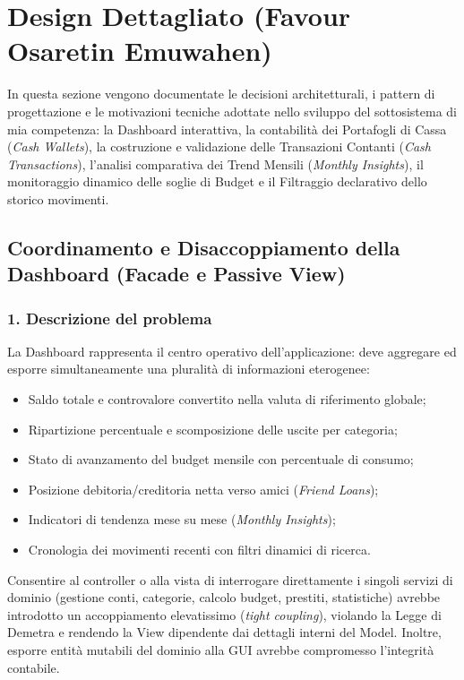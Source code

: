 \documentclass[11pt,a4paper,openright]{report}
\begin{document}
\section{Design Dettagliato (Favour Osaretin Emuwahen)}

In questa sezione vengono documentate le decisioni architetturali, i pattern di progettazione e le motivazioni tecniche adottate nello sviluppo del sottosistema di mia competenza: la Dashboard interattiva, la contabilità dei Portafogli di Cassa (\emph{Cash Wallets}), la costruzione e validazione delle Transazioni Contanti (\emph{Cash Transactions}), l'analisi comparativa dei Trend Mensili (\emph{Monthly Insights}), il monitoraggio dinamico delle soglie di Budget e il Filtraggio declarativo dello storico movimenti.

\subsection{Coordinamento e Disaccoppiamento della Dashboard (Facade e Passive View)}
\subsubsection*{1. Descrizione del problema}
La Dashboard rappresenta il centro operativo dell'applicazione: deve aggregare ed esporre simultaneamente una pluralità di informazioni eterogenee:
\begin{itemize}
  \item Saldo totale e controvalore convertito nella valuta di riferimento globale;
  \item Ripartizione percentuale e scomposizione delle uscite per categoria;
  \item Stato di avanzamento del budget mensile con percentuale di consumo;
  \item Posizione debitoria/creditoria netta verso amici (\emph{Friend Loans});
  \item Indicatori di tendenza mese su mese (\emph{Monthly Insights});
  \item Cronologia dei movimenti recenti con filtri dinamici di ricerca.
\end{itemize}
Consentire al controller o alla vista di interrogare direttamente i singoli servizi di dominio (gestione conti, categorie, calcolo budget, prestiti, statistiche) avrebbe introdotto un accoppiamento elevatissimo (\emph{tight coupling}), violando la Legge di Demetra e rendendo la View dipendente dai dettagli interni del Model. Inoltre, esporre entità mutabili del dominio alla GUI avrebbe compromesso l'integrità contabile.
\end{document}
